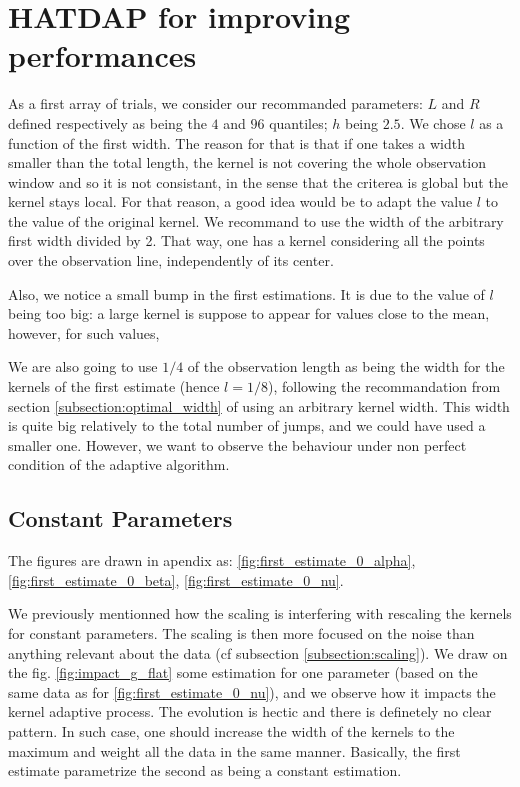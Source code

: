 \documentclass[11pt]{book}
\begin{document}
\section{HATDAP for improving performances}
\label{section_first_simul}
As a first array of trials, we consider our recommanded parameters: $L$ and $R$ defined respectively as being the $4$ and $96$ quantiles; $h$ being $2.5$. We chose $l$ as a function of the first width. The reason for that is that if one takes a width smaller than the total length, the kernel is not covering the whole observation window and so it is not consistant, in the sense that the criterea is global but the kernel stays local. For that reason, a good idea would be to adapt the value $l$ to the value of the original kernel. We recommand to use the width of the arbitrary first width divided by 2. That way, one has a kernel considering all the points over the observation line, independently of its center.



Also, we notice a small bump in the first estimations. It is due to the value of $l$ being too big: a large kernel is suppose to appear for values close to the mean, however, for such values, 


We are also going to use $1/4$ of the observation length as being the width for the kernels of the first estimate (hence $l = 1/8$), following the recommandation from section \ref{subsection:optimal_width} of using an arbitrary kernel width. This width is quite big relatively to the total number of jumps, and we could have used a smaller one. However, we want to observe the behaviour under non perfect condition of the adaptive algorithm.



\subsection{Constant Parameters}
The figures are drawn in apendix as: \ref{fig:first_estimate_0_alpha}, \ref{fig:first_estimate_0_beta}, \ref{fig:first_estimate_0_nu}. 


We previously mentionned how the scaling is interfering with rescaling the kernels for constant parameters. The scaling is then more focused on the noise than anything relevant about the data (cf subsection \ref{subsection:scaling}). We draw on the fig. \ref{fig:impact_g_flat} some estimation for one parameter (based on the same data as for \ref{fig:first_estimate_0_nu}), and we observe how it impacts the kernel adaptive process. The evolution is hectic and there is definetely no clear pattern. In such case, one should increase the width of the kernels to the maximum and weight all the data in the same manner. Basically, the first estimate parametrize the second as being a constant estimation. 
\end{document}
